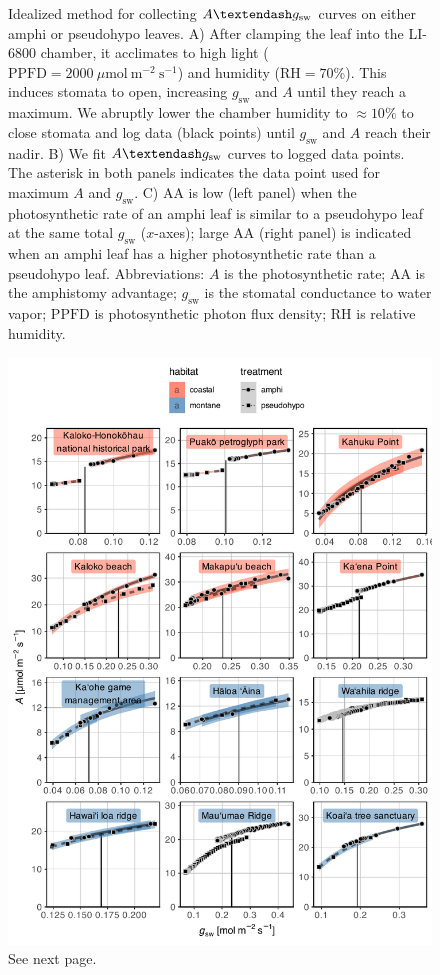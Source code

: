 \documentclass[
  letterpaper,
  DIV=11,
  numbers=noendperiod]{scrartcl}
\begin{document}
\begin{figure}
  \caption{Idealized method for collecting $A \textendash g_\text{sw}$ curves on either amphi or pseudohypo leaves. A) After clamping the leaf into the LI-6800 chamber, it acclimates to high light ($\mathrm{PPFD} = 2000~\mu \text{mol}~\text{m}^{-2}~\text{s}^{-1}$) and humidity ($\mathrm{RH} = 70\%$). This induces stomata to open, increasing $g_\mathrm{sw}$ and $A$ until they reach a maximum. We abruptly lower the chamber humidity to $\approx 10\%$ to close stomata and log data (black points) until $g_\mathrm{sw}$ and $A$ reach their nadir. B) We fit $A \textendash g_\text{sw}$ curves to logged data points. The asterisk in both panels indicates the data point used for maximum $A$ and $g_\mathrm{sw}$. C) $\mathrm{AA}$ is low (left panel) when the photosynthetic rate of an amphi leaf is similar to a pseudohypo leaf at the same total $g_\mathrm{sw}$ ($x$-axes); large $\mathrm{AA}$ (right panel) is indicated when an amphi leaf has a higher photosynthetic rate than a pseudohypo leaf. Abbreviations: $A$ is the photosynthetic rate; $\mathrm{AA}$ is the amphistomy advantage; $g_\mathrm{sw}$ is the stomatal conductance to water vapor; $\mathrm{PPFD}$ is photosynthetic photon flux density; $\mathrm{RH}$ is relative humidity.}
  \label{fig:ags-curve}
\end{figure}

\newpage

\begin{figure}
  \includegraphics{../figures/licor.pdf}
  \caption{See next page.}
  \label{fig:licor}
\end{figure}
\end{document}
